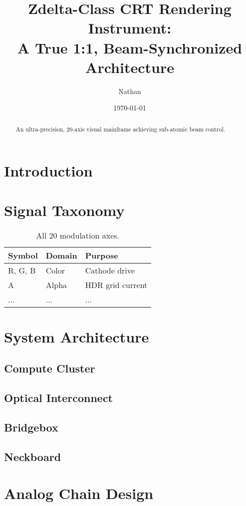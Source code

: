 \documentclass[12pt]{article}
\title{Zdelta-Class CRT Rendering Instrument:\\A True 1:1, Beam-Synchronized Architecture}
\author{Nathan}
\date{\today}
\begin{document}
\maketitle
\begin{abstract}
An ultra-precision, 20-axis visual mainframe achieving sub-atomic beam control.
\end{abstract}

\tableofcontents
\newpage

\section{Introduction}


\section{Signal Taxonomy}
\begin{table}[h]
\centering
\begin{tabular}{lll}
\toprule
Symbol & Domain      & Purpose                           \\
\midrule
R, G, B & Color      & Cathode drive                     \\
A       & Alpha      & HDR grid current                  \\
... & ... & ...\\
\bottomrule
\end{tabular}
\caption{All 20 modulation axes.}
\end{table}

\section{System Architecture}
\subsection{Compute Cluster}
\subsection{Optical Interconnect}
\subsection{Bridgebox}
\subsection{Neckboard}

\section{Analog Chain Design}

\end{document}
